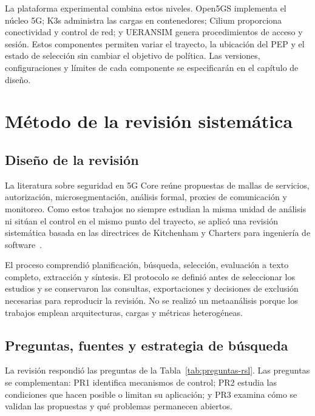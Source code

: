 La plataforma experimental combina estos niveles. Open5GS implementa el núcleo 5G; K3s administra las cargas en contenedores; Cilium proporciona conectividad y control de red; y UERANSIM genera procedimientos de acceso y sesión. Estos componentes permiten variar el trayecto, la ubicación del PEP y el estado de selección sin cambiar el objetivo de política. Las versiones, configuraciones y límites de cada componente se especificarán en el capítulo de diseño.

\section{Método de la revisión sistemática}
\label{sec:rsl}

\subsection{Diseño de la revisión}
\label{subsec:justificacion-rsl}

La literatura sobre seguridad en 5G Core reúne propuestas de mallas de servicios, autorización, microsegmentación, análisis formal, proxies de comunicación y monitoreo. Como estos trabajos no siempre estudian la misma unidad de análisis ni sitúan el control en el mismo punto del trayecto, se aplicó una revisión sistemática basada en las directrices de Kitchenham y Charters para ingeniería de software~\cite{KitchenhamCharters2007Guidelines}.

El proceso comprendió planificación, búsqueda, selección, evaluación a texto completo, extracción y síntesis. El protocolo se definió antes de seleccionar los estudios y se conservaron las consultas, exportaciones y decisiones de exclusión necesarias para reproducir la revisión. No se realizó un metaanálisis porque los trabajos emplean arquitecturas, cargas y métricas heterogéneas.

\subsection{Preguntas, fuentes y estrategia de búsqueda}
\label{subsec:protocolo-rsl}

La revisión respondió las preguntas de la Tabla~\ref{tab:preguntas-rsl}. Las preguntas se complementan: PR1 identifica mecanismos de control; PR2 estudia las condiciones que hacen posible o limitan su aplicación; y PR3 examina cómo se validan las propuestas y qué problemas permanecen abiertos.

